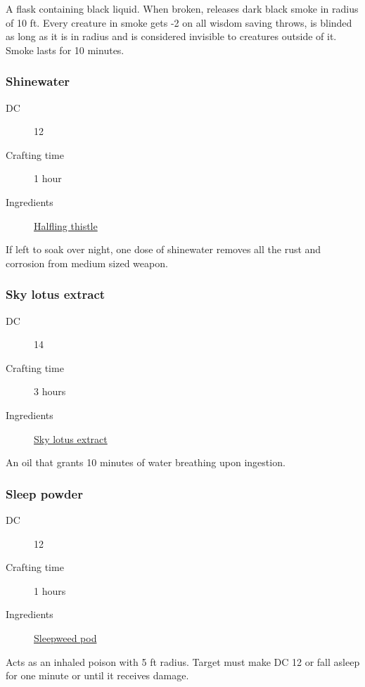 A flask containing black liquid. When broken, releases dark black smoke in radius of 10 ft. 
Every creature in smoke gets -2 on all wisdom saving throws, is blinded as long as it is in radius 
and is considered invisible to creatures outside of it. Smoke lasts for 10 minutes.

\subsubsection{Shinewater}
\label{Shinewater}

\begin{description}
\item [DC] 12 \nature
\item [Crafting time] 1 hour
\item [Ingredients] \hyperref[Halfling Thistle]{Halfling thistle}
\end{description}

If left to soak over night, one dose of shinewater removes all the rust and corrosion 
from medium sized weapon.

\subsubsection{Sky lotus extract}
\label{Sky lotus extract}

\begin{description}
\item [DC] 14 \survival
\item [Crafting time] 3 hours
\item [Ingredients] \hyperref[Sky lotus]{Sky lotus extract}
\end{description}

An oil that grants 10 minutes of water breathing upon ingestion.

\subsubsection{Sleep powder}
\label{Sleep powder}

\begin{description}
\item [DC] 12 \nature
\item [Crafting time] 1 hours
\item [Ingredients] \hyperref[Sleepweed]{Sleepweed pod}
\end{description}

Acts as an inhaled poison with 5 ft radius. Target must make DC 12 \constitutionsave or 
fall asleep for one minute or until it receives damage.

